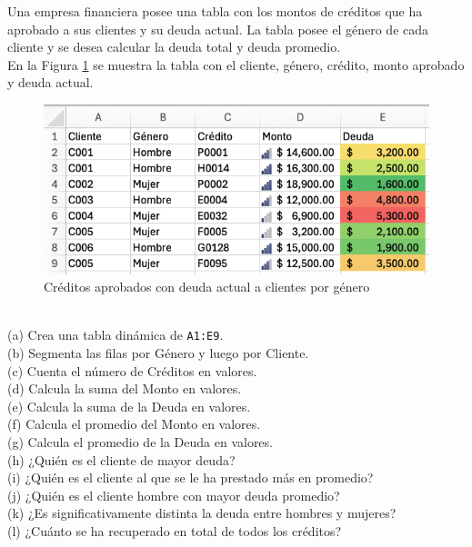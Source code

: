 \documentclass{article}
\begin{document}
Una empresa financiera posee una tabla con los montos de créditos que ha aprobado a sus clientes y su deuda actual. La tabla posee el género de cada cliente y se desea calcular la deuda total y deuda promedio.
\\[12pt]
En la Figura \ref{fig:p102} se muestra la tabla con el cliente, género, crédito, monto aprobado y deuda actual.
\begin{figure}[!h]
    \centering
    \begin{minipage}{\textwidth}
        \centering
        \includegraphics[width=\textwidth]{figures/p102.png}
    \end{minipage}
    \captionsetup{width=0.9\textwidth}
    \caption{Créditos aprobados con deuda actual a clientes por género}
    \label{fig:p102}
\end{figure}
\\
(a) Crea una tabla dinámica de \texttt{A1:E9}.
\\[6pt]
(b) Segmenta las filas por Género y luego por Cliente.
\\[6pt]
(c) Cuenta el número de Créditos en valores.
\\[6pt]
(d) Calcula la suma del Monto en valores.
\\[6pt]
(e) Calcula la suma de la Deuda en valores.
\\[6pt]
(f) Calcula el promedio del Monto en valores.
\\[6pt]
(g) Calcula el promedio de la Deuda en valores.
\\[6pt]
(h) ¿Quién es el cliente de mayor deuda?
\\[6pt]
(i) ¿Quién es el cliente al que se le ha prestado más en promedio?
\\[6pt]
(j) ¿Quién es el cliente hombre con mayor deuda promedio?
\\[6pt]
(k) ¿Es significativamente distinta la deuda entre hombres y mujeres?
\\[6pt]
(l) ¿Cuánto se ha recuperado en total de todos los créditos?
\end{document}

